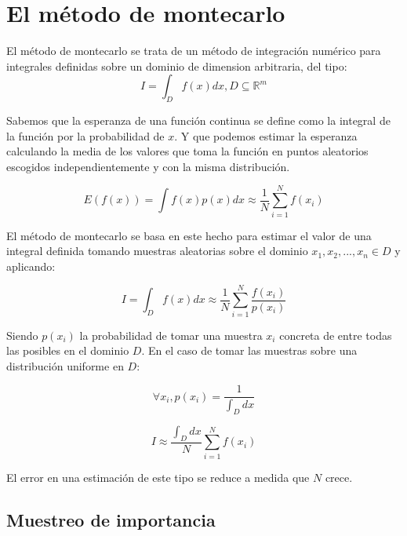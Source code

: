 \clearpage

\section{El método de montecarlo}

El método de montecarlo se trata de un método de integración numérico para integrales definidas sobre un dominio de dimension arbitraria, del tipo:
\begin{equation}
I = \int_D f(x)dx , D \subseteq \mathbb{R}^m
\end{equation}

Sabemos que la esperanza de una función continua se define como la integral de la función por la probabilidad de $x$. Y que podemos estimar la esperanza calculando la media de los valores que toma la función en puntos aleatorios escogidos independientemente y con la misma distribución.

\begin{equation}
E(f(x)) = \int f(x)p(x)dx \approx \frac{1}{N} \sum _{i=1} ^N f(x_i) 
\end{equation}


El método de montecarlo se basa en este hecho para estimar el valor de una integral definida tomando muestras aleatorias sobre el dominio $x_1, x_2, ..., x_n \in D$ y aplicando:

\begin{equation}
\label{eq:montecarlo}
I = \int_D f(x)dx \approx \frac{1}{N} \sum _{i=1} ^N \frac{f(x_i)}{p(x_i)} 
\end{equation}

Siendo $p(x_i)$ la probabilidad de tomar una muestra $x_i$ concreta de entre todas las posibles en el dominio $D$. En el caso de tomar las muestras sobre una distribución uniforme en $D$:

\begin{equation}
\forall x_i, p(x_i) = \frac{1}{\int _D dx}
\end{equation}

\begin{equation}
I \approx \frac{\int _D dx}{N} \sum_{i=1} ^N f(x_i)
\end{equation}

El error en una estimación de este tipo se reduce a medida que $N$ crece.
\clearpage

\subsection{Muestreo de importancia}
    
